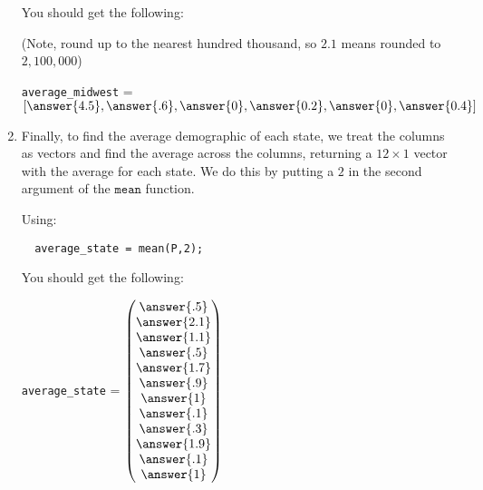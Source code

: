 \documentclass{ximera}
\begin{document}
\begin{example}
\begin{solution}
\begin{enumerate}
You should get the following:

(Note, round up to the nearest hundred thousand, so $2.1$ means rounded to $2,100,000$)


\texttt{average\_midwest} = $[\answer{4.5},\answer{.6},\answer{0},\answer{0.2},\answer{0},\answer{0.4}]$


\item Finally, to find the average demographic of each state, we treat the columns as vectors and find the average across the columns, returning a $12\times 1$ vector with the average for each state. We do this by putting a $2$ in the second argument of the $\texttt{mean}$ function.

Using:

\begin{verbatim}
  average_state = mean(P,2);
\end{verbatim}

You should get the following:


\texttt{average\_state} = $\begin{pmatrix}
  \answer{.5}\\
  \answer{2.1}\\
  \answer{1.1}\\
  \answer{.5}\\
  \answer{1.7}\\
  \answer{.9}\\
  \answer{1}\\
  \answer{.1}\\
  \answer{.3}\\
  \answer{1.9}\\
  \answer{.1}\\
  \answer{1}
\end{pmatrix}$


  \end{enumerate}
\end{solution}
\end{example}
\end{document}
